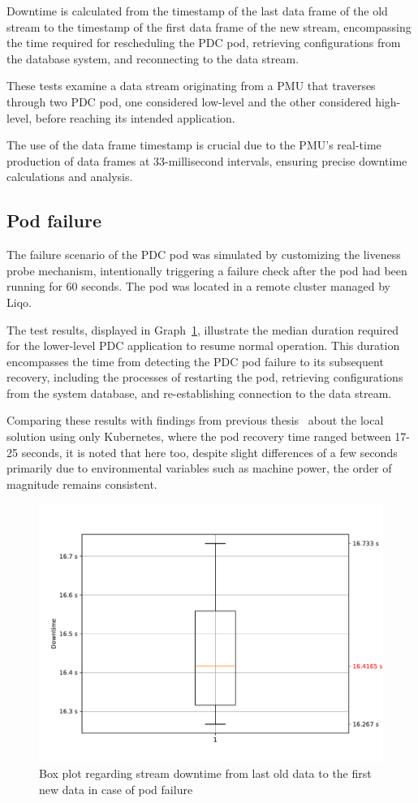 Downtime is calculated from the timestamp of the last data frame of the old stream to the timestamp of the first data frame of the new stream, encompassing the time required for rescheduling the PDC pod, retrieving configurations from the database system, and reconnecting to the data stream.

These tests examine a data stream originating from a PMU that traverses through two PDC pod, one considered low-level and the other considered high-level, before reaching its intended application.

The use of the data frame timestamp is crucial due to the PMU's real-time production of data frames at 33-millisecond intervals, ensuring precise downtime calculations and analysis.

\subsection{Pod failure}
The failure scenario of the PDC pod was simulated by customizing the liveness probe mechanism, intentionally triggering a failure check after the pod had been running for 60 seconds. The pod was located in a remote cluster managed by Liqo.

The test results, displayed in Graph~\ref{graph:pod-down}, illustrate the median duration required for the lower-level PDC application to resume normal operation. This duration encompasses the time from detecting the PDC pod failure to its subsequent recovery, including the processes of restarting the pod, retrieving configurations from the system database, and re-establishing connection to the data stream.

Comparing these results with findings from previous thesis~\cite{e3-1} about the local solution using only Kubernetes,  where the pod recovery time ranged between 17-25 seconds, it is noted that here too, despite slight differences of a few seconds primarily due to environmental variables such as machine power, the order of magnitude remains consistent. 

\begin{figure}[ht]\centering
\includegraphics[scale=0.5]{Pictures/pdc-pod-down}
\caption{Box plot regarding stream downtime from last old data to the first new data in case of pod failure}\label{graph:pod-down}
\end{figure}

